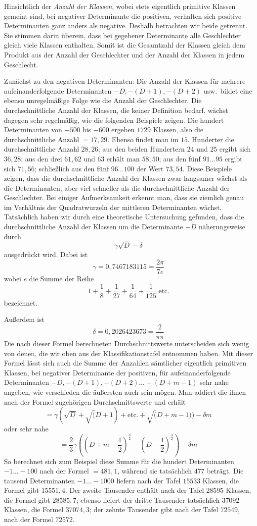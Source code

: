 Hinsichtlich der \textit{Anzahl der Klassen}, wobei stets eigentlich primitive Klassen gemeint sind, bei negativer Determinante die positiven, verhalten sich positive Determinanten ganz anders als negative. Deshalb betrachten wir beide getrennt. Sie stimmen darin überein, dass bei gegebener Determinante alle Geschlechter gleich viele Klassen enthalten. Somit ist die Gesamtzahl der Klassen gleich dem Produkt aus der Anzahl der Geschlechter und der Anzahl der Klassen in jedem Geschlecht.

Zunächst zu den negativen Determinanten: Die Anzahl der Klassen für mehrere aufeinanderfolgende Determinanten \(-D,-(D+1),-(D+2)\) usw.\ bildet eine ebenso unregelmäßige Folge wie die Anzahl der Geschlechter. Die durchschnittliche Anzahl der Klassen, die keiner Definition bedarf, wächst dagegen sehr regelmäßig, wie die folgenden Beispiele zeigen. Die hundert Determinanten von \(-500\) bis \(-600\) ergeben \(1729\) Klassen, also die durchschnittliche Anzahl \(=17{,}29\). Ebenso findet man im \(15\). Hunderter die durchschnittliche Anzahl \(28{,}26\); aus den beiden Hundertern \(24\) und \(25\) ergibt sich \(36{,}28\); aus den drei \(61,62\) und \(63\) erhält man \(58{,}50\); aus den fünf \(91\ldots95\) ergibt sich \(71{,}56\); schließlich aus den fünf \(96\ldots100\) der Wert \(73{,}54\). Diese Beispiele zeigen, dass die durchschnittliche Anzahl der Klassen zwar langsamer wächst als die Determinanten, aber viel schneller als die durchschnittliche Anzahl der Geschlechter. Bei einiger Aufmerksamkeit erkennt man, dass sie ziemlich genau im Verhältnis der Quadratwurzeln der mittleren Determinanten wächst. Tatsächlich haben wir durch eine theoretische Untersuchung gefunden, dass die durchschnittliche Anzahl der Klassen um die Determinante \(-D\) näherungsweise durch
\[\gamma\surd D-\delta\]
ausgedrückt wird. Dabei ist
\[\gamma=0{,}7467183115=\frac{2\pi}{7e}\]
wobei \(e\) die Summe der Reihe
\[1+\frac18+\frac1{27}+\frac1{64}+\frac1{125}\;\text{etc.}\]
bezeichnet.

Außerdem ist
\[\delta=0{,}2026423673=\frac2{\pi\pi}\]
Die nach dieser Formel berechneten Durchschnittswerte unterscheiden sich wenig von denen, die wir oben aus der Klassifikationstafel entnommen haben. Mit dieser Formel lässt sich auch die Summe der Anzahlen sämtlicher eigentlich primitiven Klassen, bei negativer Determinante der positiven, für
aufeinanderfolgende Determinanten \(-D,-(D+1),-(D+2)\ldots-(D+m-1)\) sehr nahe angeben, wie verschieden die äußersten auch sein mögen. Man addiert die ihnen nach der Formel zugehörigen Durchschnittswerte und erhält
\[=\gamma(\surd D+\surd(D+1)+\text{etc.}+\surd(D+m-1))-\delta m\]
oder sehr nahe
\[=\frac23\gamma((D+m-\frac12)^{\frac32}-(D-\frac12)^{\frac32})-\delta m\]
So berechnet sich zum Beispiel diese Summe für die hundert Determinanten \(-1\ldots-100\) nach der Formel \(=481{,}1\), während sie tatsächlich \(477\) beträgt. Die tausend Determinanten \(-1\ldots-1000\) liefern nach der Tafel \(15533\) Klassen, die Formel gibt \(15551{,}4\). Der zweite Tausender enthält nach der Tafel \(28595\) Klassen, die Formel gibt \(28585{,}7\); ebenso liefert der dritte Tausender tatsächlich \(37092\) Klassen, die Formel \(37074{,}3\); der zehnte Tausender gibt nach der Tafel \(72549\), nach der Formel \(72572\).
